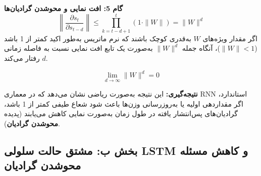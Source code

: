 \documentclass[12pt,a4paper]{article}
\begin{document}
\begin{tcolorbox}[colback=softgreen,colframe=mygreen,title=\textbf{اثبات و استدلال ریاضی}]
		\textbf{گام 5: افت نمایی و محوشدن گرادیان‌ها}
		\begin{equation}
			\left\| \frac{\partial s_t}{\partial s_{t-d}} \right\| \leq \prod_{k=t-d+1}^{t} (1 \cdot \| W \|) = \| W \|^d
		\end{equation}
		اگر مقدار ویژه‌های $W$ به‌قدری کوچک باشند که نرم ماتریس به‌طور اکید کمتر از 1 باشد ($\|W\| < 1$)، آنگاه جمله $\|W\|^d$ به‌صورت یک تابع افت نمایی نسبت به فاصله زمانی $d$ رفتار می‌کند.
		
		\begin{equation}
			\lim_{d \to \infty} \| W \|^d = 0
		\end{equation}
		
		\vspace{0.2cm}
		\textbf{نتیجه‌گیری:} این نتیجه به‌صورت ریاضی نشان می‌دهد که در معماری RNN استاندارد، اگر مقداردهی اولیه یا به‌روزرسانی وزن‌ها باعث شود شعاع طیفی کمتر از 1 باشد، گرادیان‌های پس‌انتشار یافته در طول زمان به‌صورت نمایی کاهش می‌یابند (پدیده \textbf{محوشدن گرادیان}).
	\end{tcolorbox}
	
	\subsection{بخش ب: مشتق حالت سلولی LSTM و کاهش مسئله محوشدن گرادیان}
	
\end{document}
